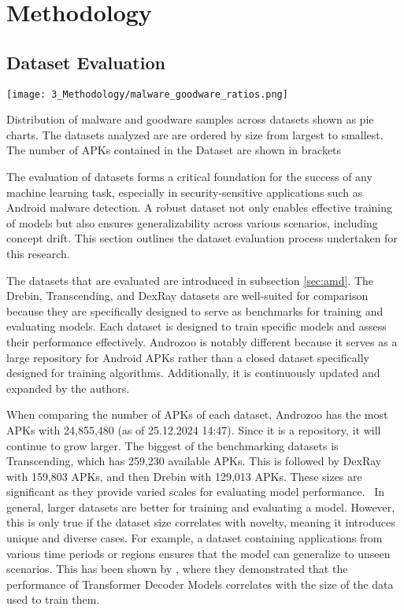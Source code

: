\chapter{Methodology} %

\label{Methodology} %




\section{Dataset Evaluation}


\begin{marginfigure}[] %
    \texttt{[image: 3\_Methodology/malware\_goodware\_ratios.png]}
    \caption{\label{fig:malratios}
    Distribution of malware and goodware samples across datasets shown as pie charts.
    The datasets analyzed are are ordered by size from largest to smallest.
    The number of APKs contained in the Dataset are shown in brackets}
\end{marginfigure}

The evaluation of datasets forms a critical foundation for the success of any machine learning task, especially in security-sensitive applications such as Android malware detection. 
A robust dataset not only enables effective training of models but also ensures generalizability across various scenarios, including concept drift. 
This section outlines the dataset evaluation process undertaken for this research.

The datasets that are evaluated are introduced in subsection \ref{sec:amd}.
The Drebin, Transcending, and DexRay datasets are well-suited for comparison because they are specifically designed to serve as benchmarks for training and evaluating models. 
Each dataset is designed to train specific models and assess their performance effectively. 
Androzoo is notably different because it serves as a large repository for Android APKs rather than a closed dataset specifically designed for training algorithms. 
Additionally, it is continuously updated and expanded by the authors.

When comparing the number of APKs of each dataset, Androzoo has the most APKs with 24,855,480 (as of 25.12.2024 14:47). 
Since it is a repository, it will continue to grow larger.
The biggest of the benchmarking datasets is Transcending, which has 259,230 available APKs. 
This is followed by DexRay with 159,803 APKs, and then Drebin with 129,013 APKs. 
These sizes are significant as they provide varied scales for evaluating model performance. 
In general, larger datasets are better for training and evaluating a model. 
However, this is only true if the dataset size correlates with novelty, meaning it introduces unique and diverse cases. 
For example, a dataset containing applications from various time periods or regions ensures that the model can generalize to unseen scenarios. 
This has been shown by \cite{scalinglaws}, where they demonstrated that the performance of Transformer Decoder Models correlates with the size of the data used to train them.

